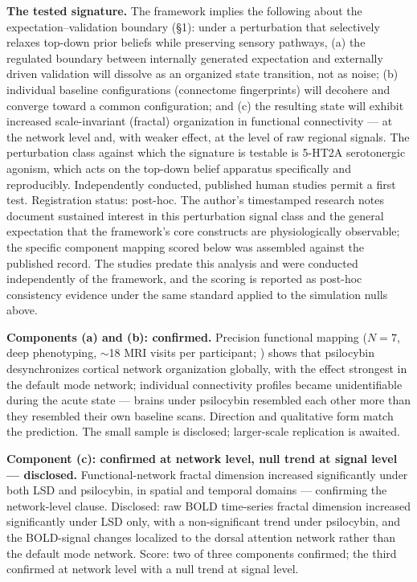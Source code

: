 \documentclass[
]{article}
\begin{document}
\textbf{The tested signature.} The framework implies the following about
the expectation--validation boundary (§1): under a perturbation that
selectively relaxes top-down prior beliefs while preserving sensory
pathways, (a) the regulated boundary between internally generated
expectation and externally driven validation will dissolve as an
organized state transition, not as noise; (b) individual baseline
configurations (connectome fingerprints) will decohere and converge
toward a common configuration; and (c) the resulting state will exhibit
increased scale-invariant (fractal) organization in functional
connectivity --- at the network level and, with weaker effect, at the
level of raw regional signals. The perturbation class against which the
signature is testable is 5-HT2A serotonergic agonism, which acts on the
top-down belief apparatus specifically and reproducibly. Independently
conducted, published human studies permit a first test. Registration
status: post-hoc. The author's timestamped research notes document
sustained interest in this perturbation signal class and the general
expectation that the framework's core constructs are physiologically
observable; the specific component mapping scored below was assembled
against the published record. The studies predate this analysis and were
conducted independently of the framework, and the scoring is reported as
post-hoc consistency evidence under the same standard applied to the
simulation nulls above.

\textbf{Components (a) and (b): confirmed.} Precision functional mapping
(\(N = 7\), deep phenotyping, \(\sim\)18 MRI visits per participant; )
shows that psilocybin desynchronizes cortical network organization
globally, with the effect strongest in the default mode network;
individual connectivity profiles became unidentifiable during the acute
state --- brains under psilocybin resembled each other more than they
resembled their own baseline scans. Direction and qualitative form match
the prediction. The small sample is disclosed; larger-scale replication
is awaited.

\textbf{Component (c): confirmed at network level, null trend at signal
level --- disclosed.} Functional-network fractal dimension increased
significantly under both LSD and psilocybin, in spatial and temporal
domains --- confirming the network-level clause. Disclosed: raw BOLD
time-series fractal dimension increased significantly under LSD only,
with a non-significant trend under psilocybin, and the BOLD-signal
changes localized to the dorsal attention network rather than the
default mode network. Score: two of three components confirmed; the
third confirmed at network level with a null trend at signal level.
\end{document}
